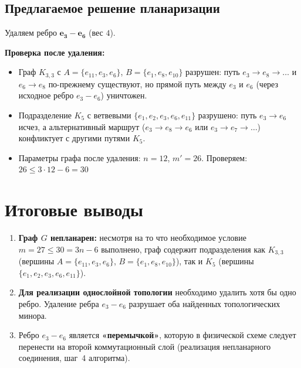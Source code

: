 \documentclass[a4paper,12pt]{article}
\begin{document}
\subsection*{Предлагаемое решение планаризации}

Удаляем ребро $\boldsymbol{e_3 - e_6}$ (вес $4$).

\textbf{Проверка после удаления:}
\begin{itemize}
	\item Граф $K_{3,3}$ с $A = \{e_{11}, e_3, e_6\}$, $B = \{e_1, e_8, e_{10}\}$
	      разрушен: путь $e_3 \to e_8 \to \ldots$ и $e_6 \to e_8$ по-прежнему существуют,
	      но прямой путь между $e_3$ и $e_6$ (через исходное ребро $e_3{-}e_6$) уничтожен.
	\item Подразделение $K_5$ с ветвевыми $\{e_1, e_2, e_3, e_6, e_{11}\}$
	      разрушено: путь $e_3 \to e_6$ исчез, а альтернативный маршрут
	      ($e_3 \to e_8 \to e_6$ или $e_3 \to e_7 \to \ldots$) конфликтует с другими
	      путями $K_5$.
	\item Параметры графа после удаления: $n = 12$, $m' = 26$.
	      Проверяем: $26 \leq 3 \cdot 12 - 6 = 30$ \checkmark
\end{itemize}

\noindent{}

\section*{Итоговые выводы}

\begin{enumerate}
	\item \textbf{Граф $G$ непланарен:} несмотря на то что необходимое условие
	      $m = 27 \leq 30 = 3n{-}6$ выполнено, граф содержит подразделения как $K_{3,3}$
	      (вершины $A = \{e_{11}, e_3, e_6\}$, $B = \{e_1, e_8, e_{10}\}$), так и $K_5$
	      (вершины $\{e_1, e_2, e_3, e_6, e_{11}\}$).
	\item \textbf{Для реализации однослойной топологии} необходимо удалить хотя бы одно ребро.
	      Удаление ребра $e_3 - e_6$ разрушает оба найденных топологических минора.
	\item Ребро $e_3 - e_6$ является \textbf{«перемычкой»}, которую в физической схеме
	      следует перенести на второй коммутационный слой (реализация непланарного соединения,
	      шаг~4 алгоритма).
\end{enumerate}
\end{document}
